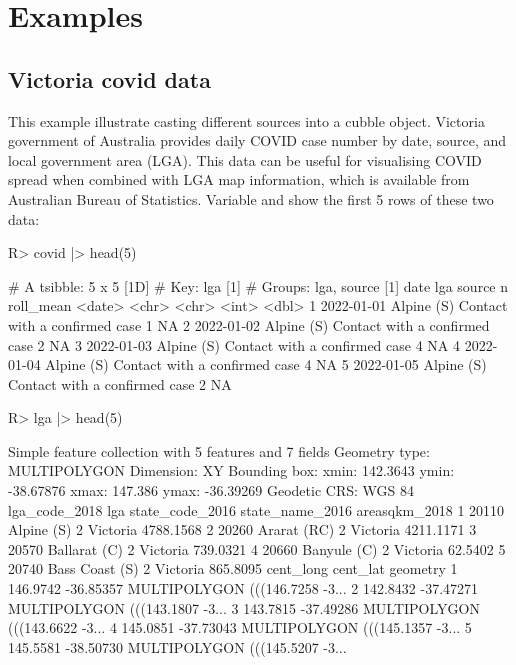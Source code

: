 \documentclass[
]{jss}
\begin{document}
\hypertarget{examples}{%
\section{Examples}\label{examples}}

\hypertarget{victoria-covid-data}{%
\subsection{Victoria covid data}\label{victoria-covid-data}}

This example illustrate casting different sources into a cubble object. Victoria government of Australia provides daily COVID case number by date, source, and local government area (LGA). This data can be useful for visualising COVID spread when combined with LGA map information, which is available from Australian Bureau of Statistics. Variable  and  show the first 5 rows of these two data:

\begin{CodeChunk}
\begin{CodeInput}
R> covid |> head(5)
\end{CodeInput}
\begin{CodeOutput}
# A tsibble: 5 x 5 [1D]
# Key:       lga [1]
# Groups:    lga, source [1]
  date       lga        source                            n roll_mean
  <date>     <chr>      <chr>                         <int>     <dbl>
1 2022-01-01 Alpine (S) Contact with a confirmed case     1        NA
2 2022-01-02 Alpine (S) Contact with a confirmed case     2        NA
3 2022-01-03 Alpine (S) Contact with a confirmed case     4        NA
4 2022-01-04 Alpine (S) Contact with a confirmed case     4        NA
5 2022-01-05 Alpine (S) Contact with a confirmed case     2        NA
\end{CodeOutput}
\begin{CodeInput}
R> lga |> head(5)
\end{CodeInput}
\begin{CodeOutput}
Simple feature collection with 5 features and 7 fields
Geometry type: MULTIPOLYGON
Dimension:     XY
Bounding box:  xmin: 142.3643 ymin: -38.67876 xmax: 147.386 ymax: -36.39269
Geodetic CRS:  WGS 84
  lga_code_2018            lga state_code_2016 state_name_2016 areasqkm_2018
1         20110     Alpine (S)               2        Victoria     4788.1568
2         20260    Ararat (RC)               2        Victoria     4211.1171
3         20570   Ballarat (C)               2        Victoria      739.0321
4         20660    Banyule (C)               2        Victoria       62.5402
5         20740 Bass Coast (S)               2        Victoria      865.8095
  cent_long  cent_lat                       geometry
1  146.9742 -36.85357 MULTIPOLYGON (((146.7258 -3...
2  142.8432 -37.47271 MULTIPOLYGON (((143.1807 -3...
3  143.7815 -37.49286 MULTIPOLYGON (((143.6622 -3...
4  145.0851 -37.73043 MULTIPOLYGON (((145.1357 -3...
5  145.5581 -38.50730 MULTIPOLYGON (((145.5207 -3...
\end{CodeOutput}
\end{CodeChunk}
\end{document}
